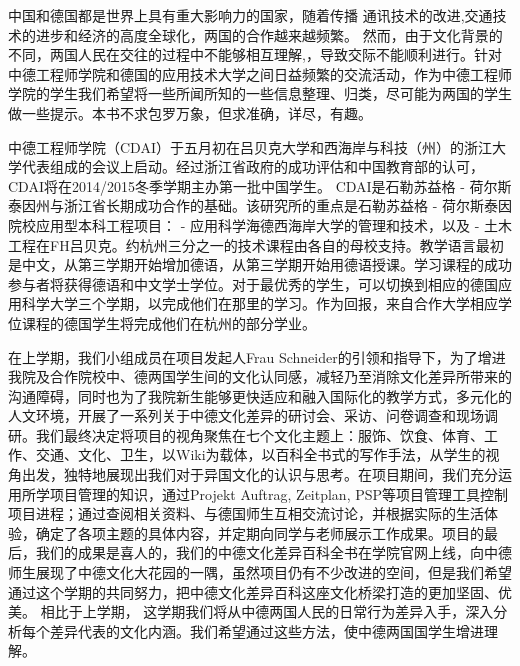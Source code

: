 \begin{minipage}{\linewidth}
\Huge\sffamily{} \par
\end{minipage}
\thispagestyle{empty}
 \vspace*{3cm}
 中国和德国都是世界上具有重大影响力的国家，随着传播 通讯技术的改进,交通技术的进步和经济的高度全球化，两国的合作越来越频繁。 然而，由于文化背景的不同，两国人民在交往的过程中不能够相互理解,，导致交际不能顺利进行。针对中德工程师学院和德国的应用技术大学之间日益频繁的交流活动，作为中德工程师学院的学生我们希望将一些所闻所知的一些信息整理、归类，尽可能为两国的学生做一些提示。本书不求包罗万象，但求准确，详尽，有趣。
\par
中德工程师学院（CDAI）于五月初在吕贝克大学和西海岸与科技（州）的浙江大学代表组成的会议上启动。经过浙江省政府的成功评估和中国教育部的认可，CDAI将在2014/2015冬季学期主办第一批中国学生。 CDAI是石勒苏益格 - 荷尔斯泰因州与浙江省长期成功合作的基础。该研究所的重点是石勒苏益格 - 荷尔斯泰因院校应用型本科工程项目： - 应用科学海德西海岸大学的管理和技术，以及 - 土木工程在FH吕贝克。约杭州三分之一的技术课程由各自的母校支持。教学语言最初是中文，从第三学期开始增加德语，从第三学期开始用德语授课。学习课程的成功参与者将获得德语和中文学士学位。对于最优秀的学生，可以切换到相应的德国应用科学大学三个学期，以完成他们在那里的学习。作为回报，来自合作大学相应学位课程的德国学生将完成他们在杭州的部分学业。
\par
 在上学期，我们小组成员在项目发起人Frau Schneider的引领和指导下，为了增进我院及合作院校中、德两国学生间的文化认同感，减轻乃至消除文化差异所带来的沟通障碍，同时也为了我院新生能够更快适应和融入国际化的教学方式，多元化的人文环境，开展了一系列关于中德文化差异的研讨会、采访、问卷调查和现场调研。我们最终决定将项目的视角聚焦在七个文化主题上：服饰、饮食、体育、工作、交通、文化、卫生，以Wiki为载体，以百科全书式的写作手法，从学生的视角出发，独特地展现出我们对于异国文化的认识与思考。在项目期间，我们充分运用所学项目管理的知识，通过Projekt Auftrag, Zeitplan, PSP等项目管理工具控制项目进程；通过查阅相关资料、与德国师生互相交流讨论，并根据实际的生活体验，确定了各项主题的具体内容，并定期向同学与老师展示工作成果。项目的最后，我们的成果是喜人的，我们的中德文化差异百科全书在学院官网上线，向中德师生展现了中德文化大花园的一隅，虽然项目仍有不少改进的空间，但是我们希望通过这个学期的共同努力，把中德文化差异百科这座文化桥梁打造的更加坚固、优美。
 相比于上学期， 这学期我们将从中德两国人民的日常行为差异入手，深入分析每个差异代表的文化内涵。我们希望通过这些方法，使中德两国国学生增进理解。
